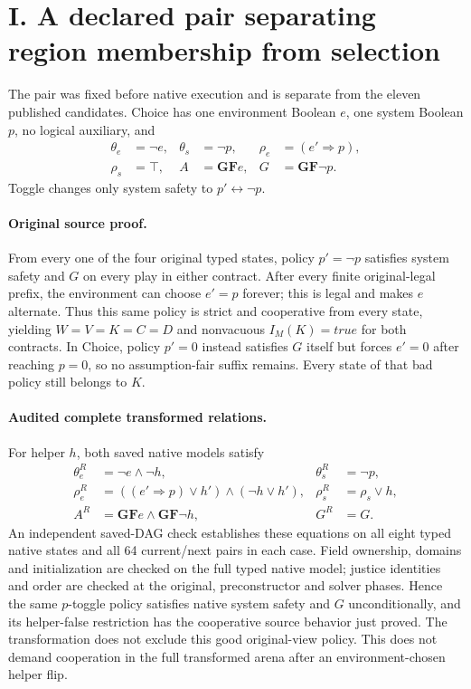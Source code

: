\section*{I. A declared pair separating region membership from selection}
\label{supp:choice-pair}
The pair was fixed before native execution and is separate from the
eleven published candidates. Choice has one environment Boolean $e$,
one system Boolean $p$, no logical auxiliary, and
\[
\begin{aligned}
\theta_e&=\neg e,&\theta_s&=\neg p,&\rho_e&=(e'\Rightarrow p),\\
\rho_s&=\top,& A&=\mathbf{G}\mathbf{F}e,&G&=\mathbf{G}\mathbf{F}\neg p.
\end{aligned}
\]
Toggle changes only system safety to $p'\leftrightarrow\neg p$.

\paragraph{Original source proof.}
From every one of the four original typed states, policy $p'=\neg p$
satisfies system safety and $G$ on every play in either contract.
After every finite original-legal prefix, the environment can choose
$e'=p$ forever; this is legal and makes $e$ alternate. Thus this same
policy is strict and cooperative from every state, yielding
$W=V=K=C=D$ and nonvacuous $I_M(K)=\mathit{true}$ for both contracts.
In Choice, policy $p'=0$ instead satisfies $G$ itself but forces $e'=0$
after reaching $p=0$, so no assumption-fair suffix remains. Every
state of that bad policy still belongs to $K$.

\paragraph{Audited complete transformed relations.}
For helper $h$, both saved native models satisfy
\[
\begin{aligned}
\theta_e^R&=\neg e\land\neg h,&\theta_s^R&=\neg p,\\
\rho_e^R&=((e'\Rightarrow p)\lor h')\land(\neg h\lor h'),&
\rho_s^R&=\rho_s\lor h,\\
A^R&=\mathbf{G}\mathbf{F}e\land\mathbf{G}\mathbf{F}\neg h,&G^R&=G.
\end{aligned}
\]
An independent saved-DAG check establishes these equations on all eight
typed native states and all 64 current/next pairs in each case.
Field ownership, domains and initialization are checked on the full
typed native model; justice identities and order are checked at the
original, preconstructor and solver phases. Hence
the same $p$-toggle policy satisfies native system safety and $G$
unconditionally, and its helper-false restriction has the cooperative
source behavior just proved. The transformation does not exclude this
good original-view policy. This does not demand cooperation in the full
transformed arena after an environment-chosen helper flip.

